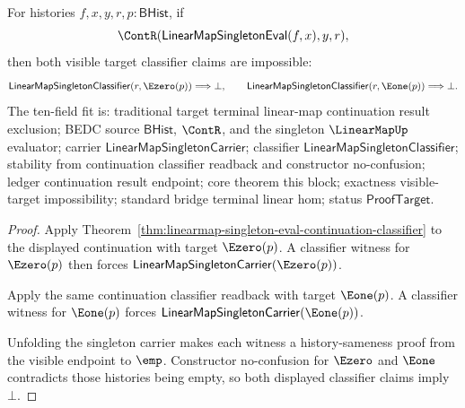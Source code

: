\begin{theorem}
\label{thm:linearmap-singleton-eval-continuation-visible-target-exclusion}
For histories $f,x,y,r,p:\mathsf{BHist}$, if
$$
\ContR(\mathsf{LinearMapSingletonEval}(f,x),y,r),
$$
then both visible target classifier claims are impossible:
$$
\mathsf{LinearMapSingletonClassifier}(r,\Ezero(p))\Longrightarrow\bot,
\qquad
\mathsf{LinearMapSingletonClassifier}(r,\Eone(p))\Longrightarrow\bot.
$$
The ten-field fit is: traditional target terminal linear-map continuation
result exclusion; BEDC source $\mathsf{BHist}$, $\ContR$, and the singleton
$\LinearMapUp$ evaluator; carrier $\mathsf{LinearMapSingletonCarrier}$;
classifier $\mathsf{LinearMapSingletonClassifier}$; stability from
continuation classifier readback and constructor no-confusion; ledger
continuation result endpoint; core theorem this block; exactness visible-target
impossibility; standard bridge terminal linear hom; status
$\mathsf{ProofTarget}$.
\end{theorem}
\begin{proof}
Apply Theorem~\ref{thm:linearmap-singleton-eval-continuation-classifier} to
the displayed continuation with target $\Ezero(p)$. A classifier witness for
$\Ezero(p)$ then forces
$\mathsf{LinearMapSingletonCarrier}(\Ezero(p))$.

Apply the same continuation classifier readback with target $\Eone(p)$. A
classifier witness for $\Eone(p)$ forces
$\mathsf{LinearMapSingletonCarrier}(\Eone(p))$.

Unfolding the singleton carrier makes each witness a history-sameness proof
from the visible endpoint to $\emp$. Constructor no-confusion for $\Ezero$ and
$\Eone$ contradicts those histories being empty, so both displayed classifier
claims imply $\bot$.
\end{proof}



